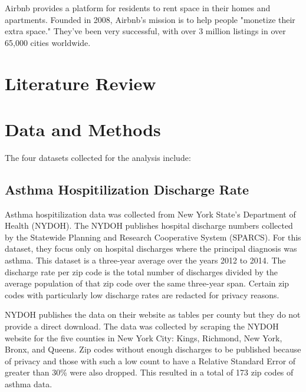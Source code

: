 \documentclass[conference]{IEEEtran}
\begin{document}
Airbnb provides a platform for residents to rent space in their homes and apartments.
Founded in 2008, Airbnb's mission is to help people "monetize their extra space." They've
been very successful, with over 3 million listings in over 65,000 cities worldwide.\cite{airbnb_about_us}

\section{Literature Review}



\section{Data and Methods}
The four datasets collected for the analysis include:


\subsection{Asthma Hospitilization Discharge Rate}
Asthma hospitilization data was collected from New York State's Department of Health (NYDOH).
The NYDOH publishes hospital discharge numbers collected by the Statewide Planning
and Research Cooperative System (SPARCS). For this dataset, they focus only on hospital
discharges where the principal diagnosis was asthma. This dataset is a three-year average
over the years 2012 to 2014. The discharge rate per zip code is the total number of discharges
divided by the average population of that zip code over the same three-year span. Certain
zip codes with particularly low discharge rates are redacted for privacy reasons.

NYDOH publishes the data on their website as tables per county but they do not provide
a direct download. The data was collected by scraping the NYDOH website for
the five counties in New York City: Kings, Richmond, New York, Bronx, and Queens. Zip
codes without enough discharges to be published because of privacy and those with
such a low count to have a Relative Standard Error of greater than 30\% were also dropped.
This resulted in a total of 173 zip codes of asthma data.
\end{document}
